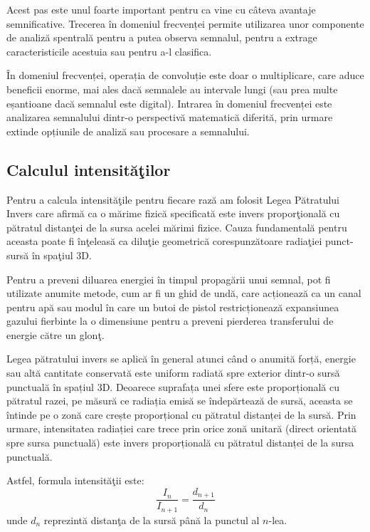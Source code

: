 	Acest pas este unul foarte important pentru ca vine cu câteva avantaje semnificative. Trecerea în domeniul frecvenței permite utilizarea unor componente de analiză spentrală pentru a putea observa semnalul, pentru a extrage caracteristicile acestuia sau pentru a-l clasifica.
	
	În domeniul frecvenței, operația de convoluție este doar o multiplicare, care aduce beneficii enorme, mai ales dacă semnalele au intervale lungi (sau prea multe eșantioane dacă semnalul este digital). Intrarea în domeniul frecvenței este analizarea semnalului dintr-o perspectivă matematică diferită, prin urmare extinde opțiunile de analiză sau procesare a semnalului.
	
\subsection{Calculul intensit\u{a}\c{t}ilor}

	Pentru a calcula intensit\u{a}\c{t}ile pentru fiecare raz\u{a} am folosit Legea P\u{a}tratului Invers \cite{square} care afirm\u{a} ca o m\u{a}rime fizic\u{a} specificat\u{a} este invers propor\c{t}ional\u{a} cu p\u{a}tratul distan\c{t}ei de la sursa acelei m\u{a}rimi fizice. Cauza fundamental\u{a} pentru aceasta poate fi \^{i}n\c{t}eleas\u{a} ca dilu\c{t}ie geometric\u{a} corespunz\u{a}toare radia\c{t}iei punct-surs\u{a} \^{i}n spa\c{t}iul 3D.
	 
	
	Pentru a preveni diluarea energiei în timpul propagării unui semnal, pot fi utilizate anumite metode, cum ar fi un ghid de undă, care acționează ca un canal pentru apă sau modul în care un butoi de pistol restricționează expansiunea gazului fierbinte la o dimensiune pentru a preveni pierderea transferului de energie către un glon\c{t}.
	 
	
	Legea pătratului invers se aplică în general atunci când o anumită forță, energie sau altă cantitate conservată este uniform radiată spre exterior dintr-o sursă punctuală în spațiul 3D. Deoarece suprafața unei sfere este proporțională cu pătratul razei, pe măsură ce radiația emisă se îndepărtează de sursă, aceasta se întinde pe o zonă care crește proporțional cu pătratul distanței de la surs\u{a}. Prin urmare, intensitatea radiației care trece prin orice zonă unitară (direct orientată spre sursa punctuală) este invers proporțională cu pătratul distanței de la sursa punctuală.
	 
	
	Astfel, formula intensit\u{a}\c{t}ii este:
	\begin{equation}
		\frac{I_n}{I_{n+1}} = \frac{d_{n+1}}{d_n}
	\end{equation}
	unde $d_n$ reprezint\u{a} distan\c{t}a de la surs\u{a} p\^{a}n\u{a} la punctul al $n$-lea.
	 

